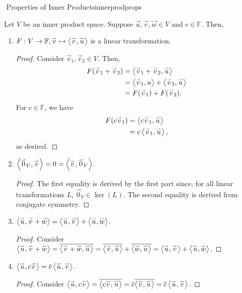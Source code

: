         \begin{theorem}{\Stop\,\,Properties of Inner Products}{innerprodprops}

            Let \(V\) be an inner product space. Suppose \(\vec{u},\vec{v},\vec{w}\in V\) and \(c\in\mathbb{F}\). Then,
            \begin{enumerate}
                \item \(F:V\to \mathbb{F},\vec{v}\mapsto\iprod{\vec{v}}{\vec{u}}\) is a linear transformation.
                \begin{proof}
                    Consider \(\vec{v}_1,\vec{v}_2\in V\). Then,
                    \begin{align*}
                        F(\vec{v}_1+\vec{v}_2)&=\iprod{\vec{v}_1+\vec{v}_2}{\vec{u}} \\
                        &=\iprod{\vec{v}_1}{u}+\iprod{\vec{v}_2}{\vec{u}} \\
                        &=F(\vec{v}_1)+F(\vec{v}_2).
                    \end{align*}
                    For \(c\in\mathbb{F}\), we have
                    \begin{align*}
                        F(c\vec{v}_1)&=\iprod{c\vec{v}_1}{\vec{u}} \\
                        &=c\iprod{\vec{v}_1}{\vec{u}},
                    \end{align*}
                    as desired.
                \end{proof}
                \item \(\iprod{\vec{0}_V}{\vec{v}}=0=\iprod{\vec{v}}{\vec{0}_V}\).
                \begin{proof}
                    The first equality is derived by the first part since, for all linear transformations \(L\), \(\vec{0}_V\in\ker(L)\). The second equality is derived from conjugate symmetry.
                \end{proof}
                \item \(\iprod{\vec{u}}{\vec{v}+\vec{w}}=\iprod{\vec{u}}{\vec{v}}+\iprod{\vec{u}}{\vec{w}}\).
                \begin{proof}
                    Consider \(\iprod{\vec{u}}{\vec{v}+\vec{w}}=\bar{\iprod{\vec{v}+\vec{w}}{\vec{u}}}=\bar{\iprod{\vec{v}}{\vec{u}}}+\bar{\iprod{\vec{w}}{\vec{u}}}=\iprod{\vec{u}}{\vec{v}}+\iprod{\vec{u}}{\vec{w}}\).
                \end{proof}
                \item \(\iprod{\vec{u}}{c\vec{v}}=\bar{c}\iprod{\vec{u}}{\vec{v}}\).
                \begin{proof}
                    Consider \(\iprod{\vec{u}}{c\vec{v}}=\bar{\iprod{c\vec{v}}{\vec{u}}}=\bar{c}\bar{\iprod{\vec{v}}{\vec{u}}}=\bar{c}\iprod{\vec{u}}{\vec{v}}\).
                \end{proof}
            \end{enumerate}
            
        \end{theorem}
